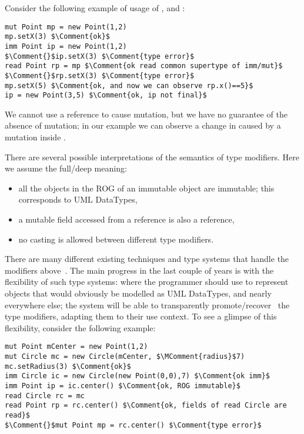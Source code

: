 \noindent Consider the following  example of usage of \Q@mut@, \Q@imm@ and \Q@read@:
\begin{lstlisting}
mut Point mp = new Point(1,2)
mp.setX(3) $\Comment{ok}$
imm Point ip = new Point(1,2)
$\Comment{}$ip.setX(3) $\Comment{type error}$
read Point rp = mp $\Comment{ok read common supertype of imm/mut}$
$\Comment{}$rp.setX(3) $\Comment{type error}$
mp.setX(5) $\Comment{ok, and now we can observe rp.x()==5}$
ip = new Point(3,5) $\Comment{ok, ip not final}$
\end{lstlisting}
\noindent We cannot use a \Q@read@ reference to cause mutation, but we have no guarantee of the absence of mutation; in our example we can observe a change in \Q@rp@ caused by a mutation inside \Q@mp@.


There are several possible interpretations of the semantics of type modifiers.
Here we assume the full/deep meaning:
\begin{itemize}
  \item all the objects in the ROG of an immutable object are immutable;
  this corresponds to UML DataTypes,
  \item a mutable field accessed from a \Q@read@ reference is also a \Q@read@ reference,
  \item no casting is allowed between different type modifiers.
\end{itemize}


\noindent There are many different existing techniques and type systems that handle the modifiers above~\cite{ZibinEtAl10,ClarkeWrigstad03,HallerOdersky10,GordonEtAl12,ServettoZucca15}.
The main progress in the last couple of years is with the flexibility of such type systems: where the programmer should use \Q@imm@ to represent objects that would obviously be modelled as UML DataTypes, and \Q@mut@ nearly everywhere else; the system will be able to transparently promote/recover~\cite{GordonEtAl12,clebsch2015deny,ServettoZucca15} the type modifiers, adapting them to their use context.
To see a glimpse of this flexibility, consider the following example:
\saveSpace
\begin{lstlisting}
mut Point mCenter = new Point(1,2)
mut Circle mc = new Circle(mCenter, $\MComment{radius}$7)
mc.setRadius(3) $\Comment{ok}$
imm Circle ic = new Circle(new Point(0,0),7) $\Comment{ok imm}$
imm Point ip = ic.center() $\Comment{ok, ROG immutable}$
read Circle rc = mc
read Point rp = rc.center() $\Comment{ok, fields of read Circle are read}$
$\Comment{}$mut Point mp = rc.center() $\Comment{type error}$ 
\end{lstlisting}
\saveSpace

